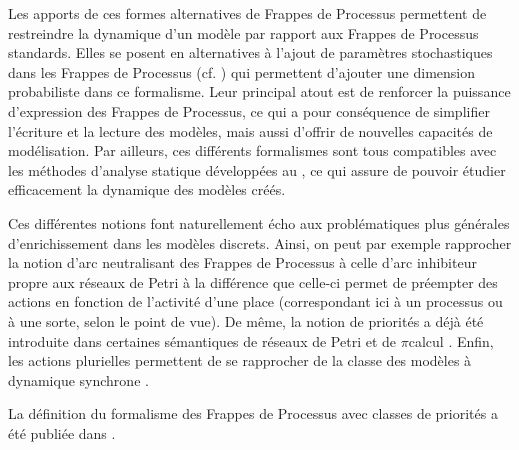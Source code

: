 Les apports de ces formes alternatives de Frappes de Processus permettent de restreindre
la dynamique
d'un modèle par rapport aux Frappes de Processus standards.
Elles se posent en alternatives à l'ajout de paramètres stochastiques dans les Frappes de Processus
(cf. )
qui permettent d'ajouter une dimension probabiliste dans ce formalisme.
Leur principal atout est de renforcer la puissance d'expression des Frappes de Processus,
ce qui a pour conséquence de simplifier l'écriture et la lecture des modèles,
mais aussi d'offrir de nouvelles capacités de modélisation.
Par ailleurs,
ces différents formalismes sont tous compatibles avec les méthodes d'analyse statique
développées au ,
ce qui assure de pouvoir étudier efficacement la dynamique des modèles créés.

Ces différentes notions font naturellement écho aux problématiques plus générales d'enrichissement
dans les modèles discrets.
Ainsi, on peut par exemple rapprocher la notion d'arc neutralisant des Frappes de Processus
à celle d'arc inhibiteur propre aux réseaux de Petri \cite{Peterson77petrinets}
à la différence que celle-ci permet de préempter des actions en fonction de l'activité
d'une place (correspondant ici à un processus ou à une sorte, selon le point de vue).
De même, la notion de priorités a déjà été introduite dans certaines sémantiques de réseaux
de Petri \cite{Marsan87} et de $\pi$\nbd calcul \cite{jlnu2010}.
Enfin, les actions plurielles permettent de se rapprocher de la classe des modèles
à dynamique synchrone .

La définition du formalisme des Frappes de Processus avec classes de priorités
a été publiée dans \cite{FPMR13-CS2Bio}.








